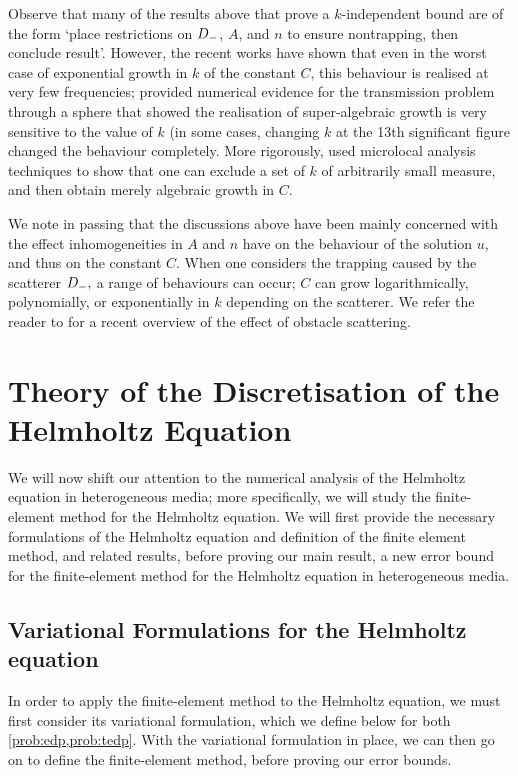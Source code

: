 Observe that many of the results above that prove a $k$-independent bound are of the form `place restrictions on $D_{-}$, $A$, and $n$ to ensure nontrapping, then conclude result'. However, the recent works \cite{MoSp:19,LaSpWu:19} have shown that even in the worst case of exponential growth in $k$ of the constant $C$, this behaviour is realised at very few frequencies; \cite{MoSp:19} provided numerical evidence for the transmission problem through a sphere that showed the realisation of super-algebraic growth is very sensitive to the value of $k$ (in some cases, changing $k$ at the 13th significant figure changed the behaviour completely. More rigorously, \cite{LaSpWu:19} used microlocal analysis techniques to show that one can exclude a set of $k$ of arbitrarily small measure, and then obtain merely algebraic growth in $C$.

We note in passing that the discussions above have been mainly concerned with the effect inhomogeneities in $A$ and $n$ have on the behaviour of the solution $u$, and thus on the constant $C$. When one considers the trapping caused by the scatterer $D_{-},$ a range of behaviours can occur; $C$ can grow logarithmically, polynomially, or exponentially in $k$ depending on the scatterer. We refer the reader to \cite[Seciotns 1.1 and 1.3]{ChGiSpSm:17} for a recent overview of the effect of obstacle scattering.
   




\section{Theory of the Discretisation of the Helmholtz Equation}\label{sec:helmfe}

We will now shift our attention to the numerical analysis of the Helmholtz equation in heterogeneous media; more specifically, we will study the finite-element method for the Helmholtz equation. We will first provide the necessary formulations of the Helmholtz equation and definition of the finite element method, and related results, before proving our main result, a new error bound for the finite-element method for the Helmholtz equation in heterogeneous media.

  \subsection{Variational Formulations for the Helmholtz equation}\label{sec:varform}

In order to apply the finite-element method to the Helmholtz equation, we must first consider its variational formulation, which we define below for both \cref{prob:edp,prob:tedp}. With the variational formulation in place, we can then go on to define the finite-element method, before proving our error bounds.
  
